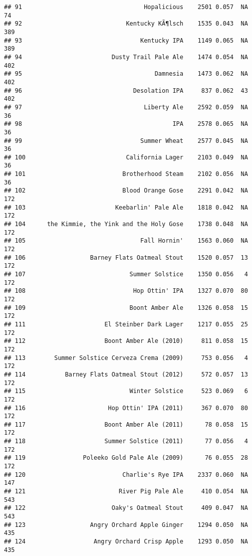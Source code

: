 \documentclass[
]{article}
\begin{document}
\begin{verbatim}
## 91                                  Hopalicious    2501 0.057  NA         74
## 92                             Kentucky KÃ¶lsch    1535 0.043  NA        389
## 93                                 Kentucky IPA    1149 0.065  NA        389
## 94                         Dusty Trail Pale Ale    1474 0.054  NA        402
## 95                                     Damnesia    1473 0.062  NA        402
## 96                               Desolation IPA     837 0.062  43        402
## 97                                  Liberty Ale    2592 0.059  NA         36
## 98                                          IPA    2578 0.065  NA         36
## 99                                 Summer Wheat    2577 0.045  NA         36
## 100                            California Lager    2103 0.049  NA         36
## 101                           Brotherhood Steam    2102 0.056  NA         36
## 102                           Blood Orange Gose    2291 0.042  NA        172
## 103                         Keebarlin' Pale Ale    1818 0.042  NA        172
## 104      the Kimmie, the Yink and the Holy Gose    1738 0.048  NA        172
## 105                                Fall Hornin'    1563 0.060  NA        172
## 106                  Barney Flats Oatmeal Stout    1520 0.057  13        172
## 107                             Summer Solstice    1350 0.056   4        172
## 108                              Hop Ottin' IPA    1327 0.070  80        172
## 109                             Boont Amber Ale    1326 0.058  15        172
## 111                      El Steinber Dark Lager    1217 0.055  25        172
## 112                      Boont Amber Ale (2010)     811 0.058  15        172
## 113        Summer Solstice Cerveza Crema (2009)     753 0.056   4        172
## 114           Barney Flats Oatmeal Stout (2012)     572 0.057  13        172
## 115                             Winter Solstice     523 0.069   6        172
## 116                       Hop Ottin' IPA (2011)     367 0.070  80        172
## 117                      Boont Amber Ale (2011)      78 0.058  15        172
## 118                      Summer Solstice (2011)      77 0.056   4        172
## 119                Poleeko Gold Pale Ale (2009)      76 0.055  28        172
## 120                           Charlie's Rye IPA    2337 0.060  NA        147
## 121                          River Pig Pale Ale     410 0.054  NA        543
## 122                        Oaky's Oatmeal Stout     409 0.047  NA        543
## 123                  Angry Orchard Apple Ginger    1294 0.050  NA        435
## 124                   Angry Orchard Crisp Apple    1293 0.050  NA        435

\end{verbatim}
\end{document}
